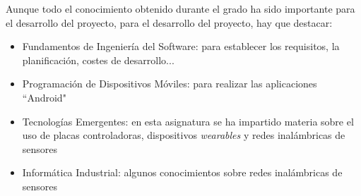 Aunque todo el conocimiento obtenido durante el grado ha sido importante para el desarrollo del proyecto,
para el desarrollo del proyecto, hay que destacar:
  \begin{itemize}
    \item Fundamentos de Ingeniería del Software: para establecer los requisitos,
    la planificación, costes de desarrollo...
    \item Programación de Dispositivos Móviles: para realizar las aplicaciones ``Android"
    \item Tecnologías Emergentes: en esta asignatura se ha impartido materia sobre el uso
    de placas controladoras, dispositivos \textit{wearables} y redes inalámbricas de sensores
    \item Informática Industrial: algunos conocimientos sobre redes inalámbricas de sensores
  \end{itemize}
